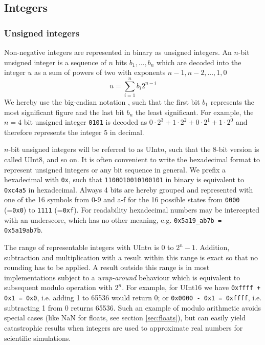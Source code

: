 \subsection{Integers}
\label{sec:integers}

\subsubsection{Unsigned integers}
\label{sec:uint}

Non-negative integers are represented in binary as unsigned integers. An $n$-bit unsigned integer is a sequence of $n$ bits
$b_1, ..., b_n$ which are decoded into the integer $u$ as a sum of powers of two with exponents $n-1,n-2,...,1,0$
\begin{equation}
	u = \sum_{i=1}^{n} b_i 2^{n-i}
	\label{eq:uint}
\end{equation}
We hereby use the big-endian notation \citep{Cohen1981,James1990}, such that the first bit $b_1$ represents the most significant figure and the last bit $b_n$ the
least significant. For example, the $n=4$ bit unsigned integer \texttt{0101} is decoded as
$0 \cdot 2^3 + 1 \cdot 2^2 + 0 \cdot 2^1 + 1 \cdot 2^0$ and therefore represents the integer $5$ in decimal.

$n$-bit unsigned integers will be referred to as UInt$n$, such that the 8-bit version is called UInt8, and so on. It is often convenient to
write the hexadecimal format to represent unsigned integers or any bit sequence in general. We prefix a hexadecimal with
\texttt{0x}, such that \texttt{1100010010100101} in binary is equivalent to \texttt{0xc4a5} in hexadecimal. Always 4 bits are hereby
grouped and represented with one of the 16 symbols from 0-9 and a-f for the 16 possible states from \texttt{0000} (=\texttt{0x0})
to \texttt{1111} (=\texttt{0xf}). For readability hexadecimal numbers may be intercepted with an underscore, which has no
other meaning, e.g. \texttt{0x5a19\_ab7b = 0x5a19ab7b}.

The range of representable integers with UInt$n$ is 0 to $2^n-1$. Addition, subtraction and multiplication with a result within this
range is exact so that no rounding has to be applied. A result outside this range is in most implementations subject to a \emph{wrap-around}
behaviour which is equivalent to subsequent modulo operation with $2^n$. For example, for UInt16 we have \texttt{0xffff + 0x1 = 0x0}, i.e.
adding 1 to 65536 would return 0; or \texttt{0x0000 - 0x1 = 0xffff}, i.e. subtracting 1 from 0 returns 65536. Such an example of modulo
arithmetic avoids special cases (like NaN for floats, see section \ref{sec:floats}), but can easily yield catastrophic results when integers
are used to approximate real numbers for scientific simulations.

